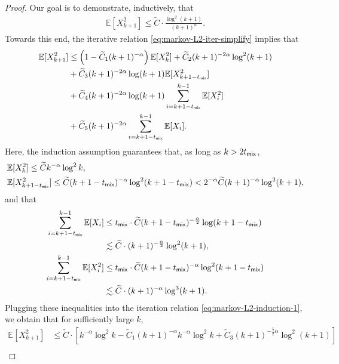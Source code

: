 \begin{proof}
Our goal is to demonstrate, inductively, that
\begin{align}\label{eq:markov-L2-induction-goal}
\mathbb{E}[X_{k+1}^2] \leq \widetilde{C} \cdot \frac{\log^2 (k+1)}{(k+1)^{\alpha}}.
\end{align}
Towards this end, the iterative relation \eqref{eq:markov-L2-iter-simplify} implies that
\begin{align}\label{eq:markov-L2-induction-1}
\mathbb{E}[X_{k+1}^2] &\leq \left(1-\widetilde{C}_1(k+1)^{-\alpha}\right)\mathbb{E}[X_k^2] + \widetilde{C}_2 (k+1)^{-2\alpha}\log^2(k+1) \nonumber \\ 
&+ \widetilde{C}_3(k+1)^{-2\alpha} \log (k+1) \mathbb{E}[X_{k+1-t_{\mathsf{mix}}}^2] \nonumber \\ 
&+ \widetilde{C}_4(k+1)^{-2\alpha} \log(k+1) \sum_{i=k+1-t_{\mathsf{mix}}}^{k-1} \mathbb{E}[X_i^2] \nonumber \\ 
&+ \widetilde{C}_5(k+1)^{-2\alpha}\sum_{i=k+1-t_{\mathsf{mix}}}^{k-1} \mathbb{E}[X_i].
\end{align}
Here, the induction assumption guarantees that, as long as $k > 2t_{\mathsf{mix}}$, 
\begin{align*}
&\mathbb{E}[X_k^2] \leq \widetilde{C} k^{-\alpha} \log^2 k, \\ 
&\mathbb{E}[X_{k+1-t_{\mathsf{mix}}}^2] \leq \widetilde{C} (k+1-t_{\mathsf{mix}})^{-\alpha} \log^2(k+1-t_{\mathsf{mix}}) < 2^{-\alpha} \widetilde{C} (k+1)^{-\alpha} \log^2(k+1), 
\end{align*}
and that 
\begin{align*}
\sum_{i=k+1-t_{\mathsf{mix}}}^{k-1} \mathbb{E}[X_i] &\leq t_{\mathsf{mix}} \cdot \widetilde{C} (k+1-t_{\mathsf{mix}})^{-\frac{\alpha}{2}} \log(k+1-t_{\mathsf{mix}}) \\ 
&\lesssim \widetilde{C} \cdot (k+1)^{-\frac{\alpha}{2}} \log^2(k+1),\\ 
\sum_{i=k+1-t_{\mathsf{mix}}}^{k-1} \mathbb{E}[X_i^2] &\leq t_{\mathsf{mix}} \cdot \widetilde{C} (k+1-t_{\mathsf{mix}})^{-\alpha} \log^2(k+1-t_{\mathsf{mix}}) \\ 
&\lesssim \widetilde{C} \cdot (k+1)^{-\alpha} \log^3(k+1).
\end{align*}
Plugging these inequalities into the iteration relation \eqref{eq:markov-L2-induction-1}, we obtain that for sufficiently large $k$,
\begin{align*}
\mathbb{E}[X_{k+1}^2] &\leq \widetilde{C} \cdot \left[k^{-\alpha} \log^2 k - \widetilde{C}_1(k+1)^{-\alpha} k^{-\alpha} \log^2 k + \widetilde{C}_3 (k+1)^{-\frac{5}{2}\alpha}\log^2(k+1)\right]\\ 

\end{align*}
\end{proof}
